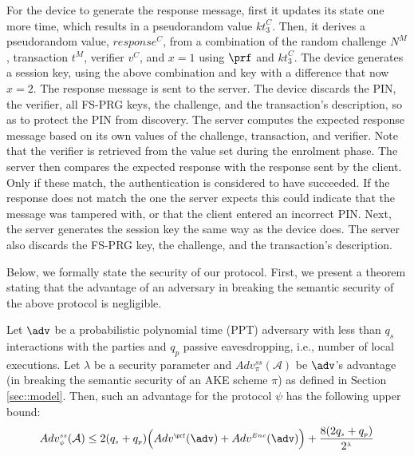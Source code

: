 \documentclass[runningheads]{llncs}
\newcommand{\sss}{\scriptscriptstyle}
\newcommand{\nonce}{\ensuremath{{N}}}
\newcommand{\keyt}{\ensuremath{{kt}}}
\newcommand{\trans}{\ensuremath{{t}}}
\renewcommand{\verifier}{\ensuremath{{v}}}
\newcommand{\VC}[1]{\ensuremath{#1^{\sss C}}}
\newcommand{\VS}[1]{\ensuremath{#1^{\sss S}}}
\newcommand{\VM}[1]{\ensuremath{#1^{\sss M}}}
\newcommand{\A}{\mathcal{A}}
\begin{document}


For the device to generate the response message, first it updates its state one more time, which results in a pseudorandom value \VC{\keyt_{\sss 3}}. Then, it derives a pseudorandom value, \VC{\mathit{response}}, from a combination of the random challenge \VM{\nonce}, transaction \VM{\trans}, verifier \VC{\verifier}, and $x=1$  using $\prf$ and \VC{\keyt_{\sss 3}}. The device generates a session key, using the above combination and key with a difference that now $x=2$. The response message is sent to the server. The device discards the PIN, the verifier, all FS-PRG keys, the challenge, and the transaction's description, so as to protect the PIN from discovery. The server computes the expected response message based on its own values of the challenge, transaction, and verifier. Note that the verifier is retrieved from the value set during the enrolment phase. The server then compares the expected response with the response sent by the client. Only if these match, the authentication is considered to have succeeded. If the response does not match the one the server expects this could indicate that the message was tampered with, or that the client entered an incorrect PIN. Next, the server generates the session key the same way as the device does.  The server also discards the FS-PRG key, the challenge, and the transaction's description.




Below, we formally state the security of our protocol.  First, we present a theorem stating that the advantage of an adversary in breaking the semantic security of the above protocol is negligible.  
\begin{theorem}[Semantic Security]
Let $\adv$ be a probabilistic polynomial time (PPT) adversary with less than $q_{\sss s}$ interactions with the parties and $q_{\sss p}$ passive eavesdropping, i.e., number of local executions. Let $\lambda$ be a security parameter and $Adv_{\sss\pi}^{\sss ss}(\A)$ be  $\adv$'s advantage (in breaking the semantic security of an AKE scheme $\pi$) as defined in Section \ref{sec::model}. Then, such an advantage for the protocol $\psi$ has the following upper bound:  
%
\begin{equation*} 
Adv_{\sss \psi}^{\sss ss}(\A) \leq 2(q_{\sss s}+q_{\sss p})\Big(Adv^{\sss\prf}(\adv)+Adv^{\sss Enc}(\adv)\Big)+\frac{8(2q_{\sss s}+q_{\sss p})}{2^{\sss\lambda}}
\end{equation*}
%
\end{theorem}
\end{document}
